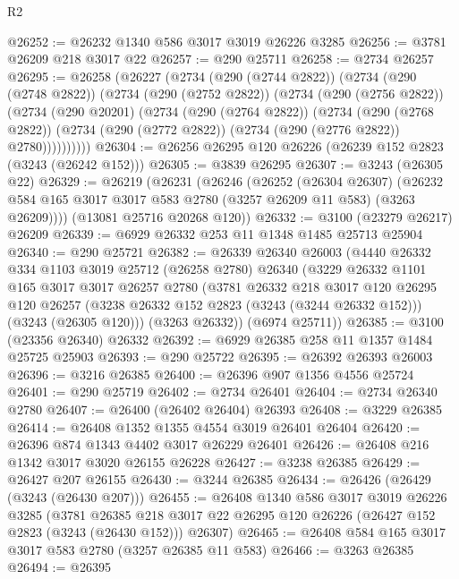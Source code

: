\begin{lexlean}{R2}
\begin{coremodule}
@26252 := @26232 @1340 @586 @3017 @3019 @26226 @3285
@26256 := @3781 @26209 @218 @3017 @22
@26257 := @290 @25711
@26258 := @2734 @26257
@26295 := @26258
    (@26227
      (@2734
        (@290 (@2744 @2822))
        (@2734
          (@290 (@2748 @2822))
          (@2734
            (@290 (@2752 @2822))
            (@2734
              (@290 (@2756 @2822))
              (@2734
                (@290 @20201)
                (@2734
                  (@290 (@2764 @2822))
                  (@2734
                    (@290 (@2768 @2822))
                    (@2734 (@290 (@2772 @2822)) (@2734 (@290 (@2776 @2822)) @2780))))))))))
@26304 := @26256 @26295 @120 @26226 (@26239 @152 @2823 (@3243 (@26242 @152)))
@26305 := @3839 @26295
@26307 := @3243 (@26305 @22)
@26329 := @26219
    (@26231
      (@26246
        (@26252
          (@26304 @26307)
          (@26232 @584 @165 @3017 @3017 @583 @2780 (@3257 @26209 @11 @583) (@3263 @26209))))
      (@13081 @25716 @20268 @120))
@26332 := @3100 (@23279 @26217) @26209
@26339 := @6929 @26332 @253 @11 @1348 @1485 @25713 @25904
@26340 := @290 @25721
@26382 := @26339
    @26340
    @26003
    (@4440
      @26332
      @334
      @1103
      @3019
      @25712
      (@26258 @2780)
      @26340
      (@3229
        @26332
        @1101
        @165
        @3017
        @3017
        @26257
        @2780
        (@3781
          @26332
          @218
          @3017
          @120
          @26295
          @120
          @26257
          (@3238 @26332 @152 @2823 (@3243 (@3244 @26332 @152)))
          (@3243 (@26305 @120)))
        (@3263 @26332))
      (@6974 @25711))
@26385 := @3100 (@23356 @26340) @26332
@26392 := @6929 @26385 @258 @11 @1357 @1484 @25725 @25903
@26393 := @290 @25722
@26395 := @26392 @26393 @26003
@26396 := @3216 @26385
@26400 := @26396 @907 @1356 @4556 @25724
@26401 := @290 @25719
@26402 := @2734 @26401
@26404 := @2734 @26340 @2780
@26407 := @26400 (@26402 @26404) @26393
@26408 := @3229 @26385
@26414 := @26408 @1352 @1355 @4554 @3019 @26401 @26404
@26420 := @26396 @874 @1343 @4402 @3017 @26229 @26401
@26426 := @26408 @216 @1342 @3017 @3020 @26155 @26228
@26427 := @3238 @26385
@26429 := @26427 @207 @26155
@26430 := @3244 @26385
@26434 := @26426 (@26429 (@3243 (@26430 @207)))
@26455 := @26408
    @1340
    @586
    @3017
    @3019
    @26226
    @3285
    (@3781
      @26385
      @218
      @3017
      @22
      @26295
      @120
      @26226
      (@26427 @152 @2823 (@3243 (@26430 @152)))
      @26307)
@26465 := @26408 @584 @165 @3017 @3017 @583 @2780 (@3257 @26385 @11 @583)
@26466 := @3263 @26385
@26494 := @26395

\end{coremodule}
\end{lexlean}
